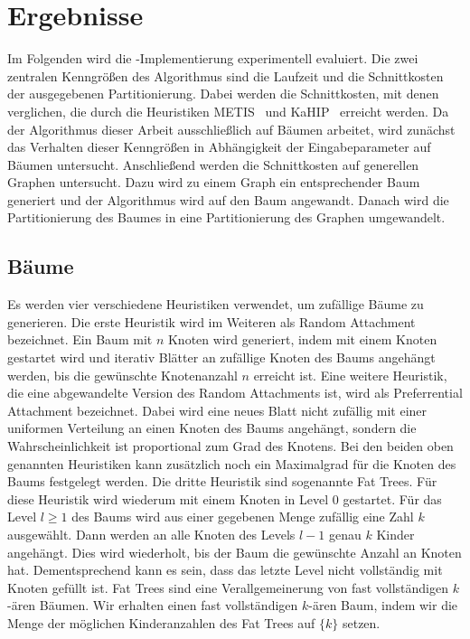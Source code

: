
\chapter{Ergebnisse}\label{chapter:ergebnisse}
Im Folgenden wird die \Cpp\hyp Implementierung experimentell evaluiert.
Die zwei zentralen Kenngrößen des Algorithmus sind die Laufzeit und die Schnittkosten der ausgegebenen Partitionierung.
Dabei werden die Schnittkosten, mit denen verglichen, die durch die Heuristiken METIS~\cite{KK98} und KaHIP~\cite{SS13} erreicht werden.
Da der Algorithmus dieser Arbeit ausschließlich auf Bäumen arbeitet, wird zunächst das Verhalten dieser Kenngrößen in Abhängigkeit der Eingabeparameter auf Bäumen untersucht.
Anschließend werden die Schnittkosten auf generellen Graphen untersucht.
Dazu wird zu einem Graph ein entsprechender Baum generiert und der Algorithmus wird auf den Baum angewandt.
Danach wird die Partitionierung des Baumes in eine Partitionierung des Graphen umgewandelt.

\section{Bäume}
Es werden vier verschiedene Heuristiken verwendet, um zufällige Bäume zu generieren.
Die erste Heuristik wird im Weiteren als Random Attachment bezeichnet. 
Ein Baum mit $n$ Knoten wird generiert, indem mit einem Knoten gestartet wird und iterativ Blätter an zufällige Knoten des Baums angehängt werden, bis die gewünschte Knotenanzahl $n$ erreicht ist.
Eine weitere Heuristik, die eine abgewandelte Version des Random Attachments ist, wird als Preferrential Attachment bezeichnet.
Dabei wird eine neues Blatt nicht zufällig mit einer uniformen Verteilung an einen Knoten des Baums angehängt, sondern die Wahrscheinlichkeit ist proportional zum Grad des Knotens.
Bei den beiden oben genannten Heuristiken kann zusätzlich noch ein Maximalgrad für die Knoten des Baums festgelegt werden.
Die dritte Heuristik sind sogenannte Fat Trees.
Für diese Heuristik wird wiederum mit einem Knoten in Level $0$ gestartet.
Für das Level $l \geq 1$ des Baums wird aus einer gegebenen Menge zufällig eine Zahl $k$ ausgewählt.
Dann werden an alle Knoten des Levels $l - 1$ genau $k$ Kinder angehängt.
Dies wird wiederholt, bis der Baum die gewünschte Anzahl an Knoten hat. 
Dementsprechend kann es sein, dass das letzte Level nicht vollständig mit Knoten gefüllt ist.
Fat Trees sind eine Verallgemeinerung von fast vollständigen $k$\hyp ären Bäumen.
Wir erhalten einen fast vollständigen $k$\hyp ären Baum, indem wir die Menge der möglichen Kinderanzahlen des Fat Trees auf $\{k\}$ setzen.

